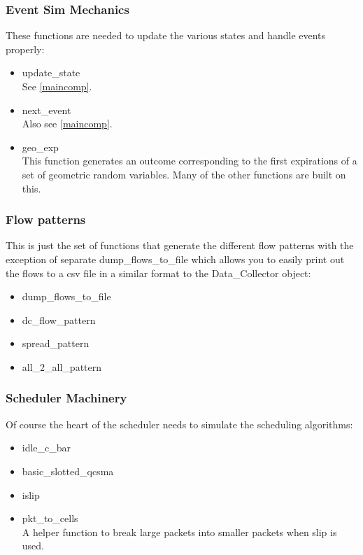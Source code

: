 \documentclass[11pt]{article}%
\begin{document}
\subsubsection{Event Sim Mechanics}
These functions are needed to update the various states and handle events properly:
\begin{itemize}
\item update\_state\\
See \ref{maincomp}.
\item next\_event\\
Also see \ref{maincomp}.
\item geo\_exp\\
This function generates an outcome corresponding to the first expirations of a set of geometric random variables.  Many of the other functions are built on this.
\end{itemize}

\subsubsection{Flow patterns}
This is just the set of functions that generate the different flow patterns with the exception of separate dump\_flows\_to\_file which allows you to easily print out the flows to a csv file in a similar format to the Data\_Collector object:
\begin{itemize}
\item dump\_flows\_to\_file
\item dc\_flow\_pattern
\item spread\_pattern
\item all\_2\_all\_pattern
\end{itemize}

\subsubsection{Scheduler Machinery}
Of course the heart of the scheduler needs to simulate the scheduling algorithms:
\begin{itemize}
\item idle\_c\_bar
\item basic\_slotted\_qcsma
\item islip
\item pkt\_to\_cells\\
A helper function to break large packets into smaller packets when slip is used.
\end{itemize}
\end{document}

